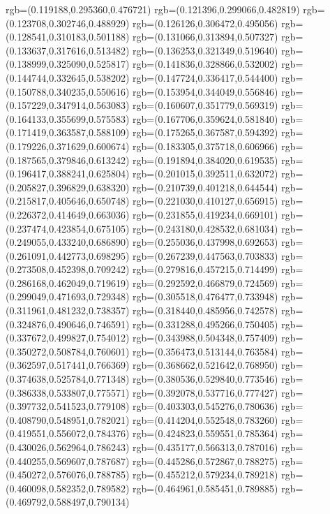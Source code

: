 {{{			rgb=(0.119188,0.295360,0.476721)
			rgb=(0.121396,0.299066,0.482819)
			rgb=(0.123708,0.302746,0.488929)
			rgb=(0.126126,0.306472,0.495056)
			rgb=(0.128541,0.310183,0.501188)
			rgb=(0.131066,0.313894,0.507327)
			rgb=(0.133637,0.317616,0.513482)
			rgb=(0.136253,0.321349,0.519640)
			rgb=(0.138999,0.325090,0.525817)
			rgb=(0.141836,0.328866,0.532002)
			rgb=(0.144744,0.332645,0.538202)
			rgb=(0.147724,0.336417,0.544400)
			rgb=(0.150788,0.340235,0.550616)
			rgb=(0.153954,0.344049,0.556846)
			rgb=(0.157229,0.347914,0.563083)
			rgb=(0.160607,0.351779,0.569319)
			rgb=(0.164133,0.355699,0.575583)
			rgb=(0.167706,0.359624,0.581840)
			rgb=(0.171419,0.363587,0.588109)
			rgb=(0.175265,0.367587,0.594392)
			rgb=(0.179226,0.371629,0.600674)
			rgb=(0.183305,0.375718,0.606966)
			rgb=(0.187565,0.379846,0.613242)
			rgb=(0.191894,0.384020,0.619535)
			rgb=(0.196417,0.388241,0.625804)
			rgb=(0.201015,0.392511,0.632072)
			rgb=(0.205827,0.396829,0.638320)
			rgb=(0.210739,0.401218,0.644544)
			rgb=(0.215817,0.405646,0.650748)
			rgb=(0.221030,0.410127,0.656915)
			rgb=(0.226372,0.414649,0.663036)
			rgb=(0.231855,0.419234,0.669101)
			rgb=(0.237474,0.423854,0.675105)
			rgb=(0.243180,0.428532,0.681034)
			rgb=(0.249055,0.433240,0.686890)
			rgb=(0.255036,0.437998,0.692653)
			rgb=(0.261091,0.442773,0.698295)
			rgb=(0.267239,0.447563,0.703833)
			rgb=(0.273508,0.452398,0.709242)
			rgb=(0.279816,0.457215,0.714499)
			rgb=(0.286168,0.462049,0.719619)
			rgb=(0.292592,0.466879,0.724569)
			rgb=(0.299049,0.471693,0.729348)
			rgb=(0.305518,0.476477,0.733948)
			rgb=(0.311961,0.481232,0.738357)
			rgb=(0.318440,0.485956,0.742578)
			rgb=(0.324876,0.490646,0.746591)
			rgb=(0.331288,0.495266,0.750405)
			rgb=(0.337672,0.499827,0.754012)
			rgb=(0.343988,0.504348,0.757409)
			rgb=(0.350272,0.508784,0.760601)
			rgb=(0.356473,0.513144,0.763584)
			rgb=(0.362597,0.517441,0.766369)
			rgb=(0.368662,0.521642,0.768950)
			rgb=(0.374638,0.525784,0.771348)
			rgb=(0.380536,0.529840,0.773546)
			rgb=(0.386338,0.533807,0.775571)
			rgb=(0.392078,0.537716,0.777427)
			rgb=(0.397732,0.541523,0.779108)
			rgb=(0.403303,0.545276,0.780636)
			rgb=(0.408790,0.548951,0.782021)
			rgb=(0.414204,0.552548,0.783260)
			rgb=(0.419551,0.556072,0.784376)
			rgb=(0.424823,0.559551,0.785364)
			rgb=(0.430026,0.562964,0.786243)
			rgb=(0.435177,0.566313,0.787016)
			rgb=(0.440255,0.569607,0.787687)
			rgb=(0.445286,0.572867,0.788275)
			rgb=(0.450272,0.576076,0.788785)
			rgb=(0.455212,0.579234,0.789218)
			rgb=(0.460098,0.582352,0.789582)
			rgb=(0.464961,0.585451,0.789885)
			rgb=(0.469792,0.588497,0.790134)
}}}
